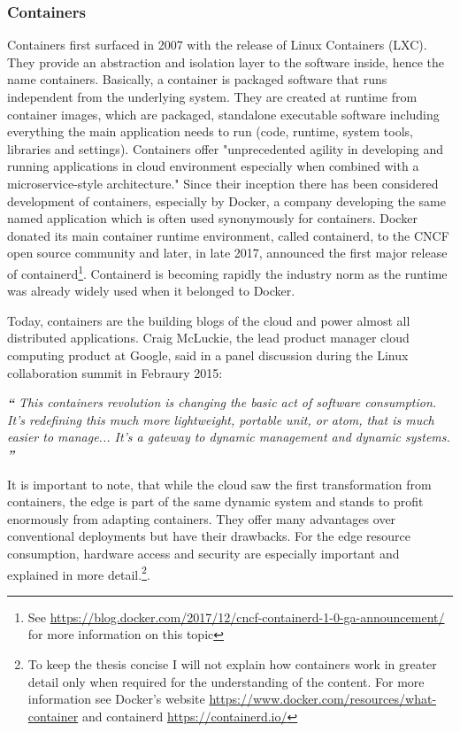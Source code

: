 \subsubsection{Containers} \label{sec:containers}
Containers first surfaced in 2007 with the release of Linux Containers (LXC). They provide an abstraction and isolation layer to the software inside, hence the name containers. Basically, a container is packaged software that runs independent from the underlying system. They are created at runtime from container images, which are packaged, standalone executable software including everything the main application needs to run (code, runtime, system tools, libraries and settings)\cite{containerDefinition:online}. Containers offer
"unprecedented agility in developing and running applications in cloud environment especially when combined with a microservice-style architecture."\cite{microserviceContainers} Since their inception there has been considered development of containers, especially by Docker, a company developing the same named application which is often used synonymously for containers. Docker donated its main container runtime environment, called containerd, to the CNCF open source community and later, in late 2017, announced the first major release of containerd\footnote{See \url{https://blog.docker.com/2017/12/cncf-containerd-1-0-ga-announcement/} for more information on this topic}. Containerd is becoming rapidly the industry norm as the runtime was already widely used when it belonged to Docker.

Today, containers are the building blogs of the cloud and power almost all distributed applications. Craig McLuckie, the lead product manager cloud computing product at Google, said in a panel discussion during the Linux collaboration summit in Febraury 2015:
\begin{displayquote}
\textit{\textbf{\large{``}}}
\textit{This containers revolution is changing the basic act of software consumption. It’s redefining this much more lightweight, portable unit, or atom, that is much easier to manage... It’s a gateway to dynamic management and dynamic systems.}
\textit{\textbf{\large{''}}}
\end{displayquote}
It is important to note, that while the cloud saw the first transformation from containers, the edge is part of the same dynamic system and stands to profit enormously from adapting containers. They offer many advantages over conventional deployments but have their drawbacks. For the edge resource consumption, hardware access and security are especially important and explained in more detail.\footnote{To keep the thesis concise I will not explain how containers work in greater detail only when required for the understanding of the content. For more information see Docker's website  \url{https://www.docker.com/resources/what-container} and containerd \url{https://containerd.io/}}.\\[0.5mm]

